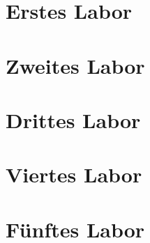 	\section{Erstes Labor}
	
	\section{Zweites Labor}
	
	\section{Drittes Labor}
	
	\section{Viertes Labor}
	
	\section{Fünftes Labor}
	
	